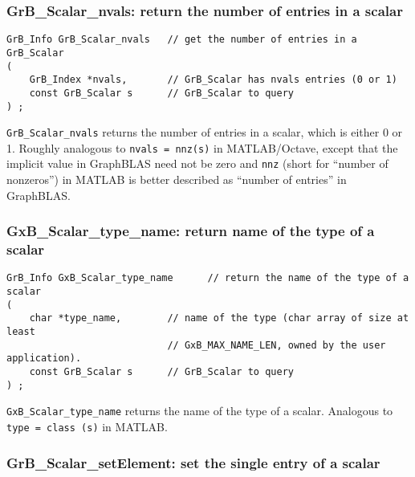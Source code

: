 \documentclass[12pt]{article}
\begin{document}
\subsubsection{{\sf GrB\_Scalar\_nvals:} return the number of entries in a scalar}
\label{scalar_nvals}

\begin{mdframed}[userdefinedwidth=6in]
{\footnotesize
\begin{verbatim}
GrB_Info GrB_Scalar_nvals   // get the number of entries in a GrB_Scalar
(
    GrB_Index *nvals,       // GrB_Scalar has nvals entries (0 or 1)
    const GrB_Scalar s      // GrB_Scalar to query
) ;
\end{verbatim}
} \end{mdframed}

\verb'GrB_Scalar_nvals' returns the number of entries in a scalar, which
is either 0 or 1.  Roughly analogous to \verb'nvals = nnz(s)' in MATLAB/Octave,
except that the implicit value in GraphBLAS need not be zero and \verb'nnz'
(short for ``number of nonzeros'') in MATLAB is better described as ``number of
entries'' in GraphBLAS.

\subsubsection{{\sf GxB\_Scalar\_type\_name:} return name of the type of a scalar}
\label{scalar_type_name}

\begin{mdframed}[userdefinedwidth=6in]
{\footnotesize
\begin{verbatim}
GrB_Info GxB_Scalar_type_name      // return the name of the type of a scalar
(
    char *type_name,        // name of the type (char array of size at least
                            // GxB_MAX_NAME_LEN, owned by the user application).
    const GrB_Scalar s      // GrB_Scalar to query
) ;
\end{verbatim}
} \end{mdframed}

\verb'GxB_Scalar_type_name' returns the name of the type of a scalar.
Analogous to \verb'type = class (s)' in MATLAB.

\subsubsection{{\sf GrB\_Scalar\_setElement:} set the single entry of a scalar}
\label{scalar_setElement}
\end{document}
